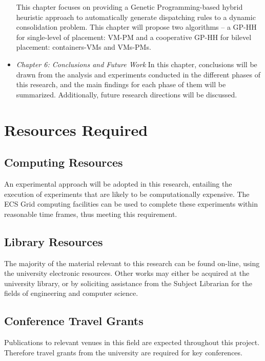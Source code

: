 \begin{itemize}
	This chapter focuses on providing a Genetic Programming-based hybrid heuristic approach to automatically generate dispatching rules to a dynamic consolidation problem. This chapter will propose two algorithms -- a GP-HH for single-level of placement: VM-PM and a cooperative GP-HH for bilevel placement: containers-VMs and VMs-PMs.
	\item \textit{Chapter 6: Conclusions and Future Work}
	In this chapter, conclusions will be drawn from the analysis and experiments conducted in the different phases of this research, and the main findings for each phase of them will be summarized. Additionally, future research directions will be discussed.

\end{itemize}


\section{Resources Required}
\subsection{Computing Resources}
An experimental approach will be adopted in this research, entailing the execution of experiments that are likely to be computationally expensive. The ECS Grid computing facilities
can be used to complete these experiments within reasonable time frames, thus meeting this requirement.
\subsection{Library Resources}
The majority of the material relevant to this research can be found on-line, using the university electronic resources. Other works may either be acquired at the university library, or
by soliciting assistance from the Subject Librarian for the fields of engineering and computer science.
\subsection{Conference Travel Grants}
Publications to relevant venues in this field are expected throughout this project. Therefore travel grants from the university are required for key conferences.